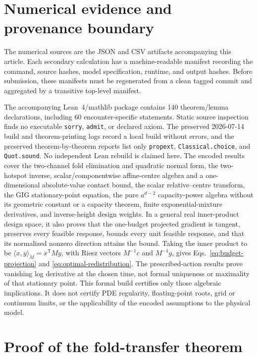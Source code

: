 \documentclass[aps,pre,reprint,amsmath,amssymb,longbibliography,floatfix]{revtex4-2}
\begin{document}
\section{Numerical evidence and provenance boundary}
\label{app:provenance}

The numerical sources are the JSON and CSV artifacts accompanying this
article. Each secondary calculation has a machine-readable manifest recording
the command, source hashes, model specification, runtime, and output hashes.
Before submission, these manifests must be regenerated from a clean tagged
commit and aggregated by a transitive top-level manifest.

The accompanying Lean~4/mathlib package contains 140 theorem/lemma
declarations, including 60 encounter-specific statements. Static source
inspection finds no executable \texttt{sorry}, \texttt{admit}, or declared
axiom. The preserved 2026-07-14 build and theorem-printing logs record a local
build without errors, and the preserved theorem-by-theorem reports list only
\texttt{propext}, \texttt{Classical.choice}, and \texttt{Quot.sound}.
No independent Lean rebuild is claimed here.
The encoded results cover the two-channel fold elimination and quadratic
normal form, the two-hotspot inverse, scalar/componentwise affine-centre
algebra and a one-dimensional absolute-value contact bound, the scalar
relative--centre transform, the GIG stationary-point equation, the pure
\(a^{d-2}\) capacity-power algebra without its geometric constant or a capacity
theorem, finite exponential-mixture derivatives, and inverse-height design
weights. In a general real inner-product design space, it also proves that the
one-budget projected gradient is tangent, preserves every feasible response,
bounds every unit feasible response, and that its normalized nonzero direction
attains the bound. Taking the inner product to be
\(\langle x,y\rangle_M=x^\mathsf TMy\), with Riesz vectors
\(M^{-1}c\) and \(M^{-1}g\), gives Eqs.~\eqref{eq:budget-projection} and
\eqref{eq:optimal-redistribution}. The prescribed-action results prove
vanishing log derivative at the chosen time, not formal uniqueness or
maximality of that stationary point.
This formal build certifies only
those algebraic implications. It does not certify PDE regularity,
floating-point roots, grid or continuum limits, or the applicability of the
encoded assumptions to the physical model.

\section{Proof of the fold-transfer theorem}
\label{sm:fold-transfer-proof}
\end{document}
